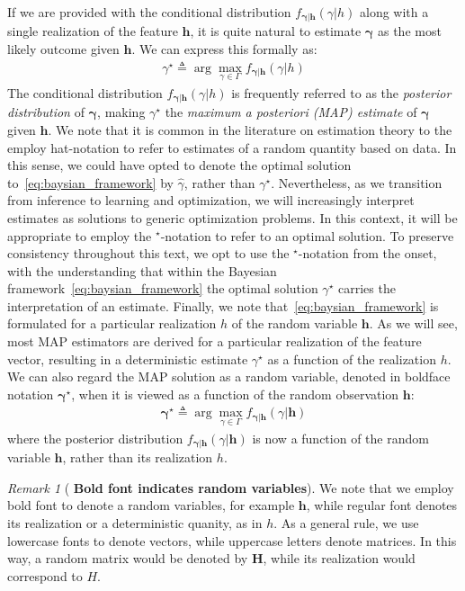\documentclass[oneside,11pt]{amsart}
\def\h{{\boldsymbol{h}}}
\theoremstyle{remark}
\newtheorem{remark}{Remark}[section]
\begin{document}
If we are provided with the conditional distribution \( f_{\boldsymbol{\gamma}|\boldsymbol{h}}(\gamma | h) \) along with a single realization of the feature \( \boldsymbol{h} \), it is quite natural to estimate \( \boldsymbol{\gamma} \) as the most likely outcome given \( \boldsymbol{h} \). We can express this formally as:
\begin{align}\label{eq:baysian_framework}
  {\gamma^{\star}} \triangleq \arg\max_{{\gamma} \in \Gamma} f_{\boldsymbol{\gamma}|\boldsymbol{h}}(\gamma | h)
\end{align}
The conditional distribution \( f_{\boldsymbol{\gamma}|\boldsymbol{h}}(\gamma | h) \) is frequently referred to as the \emph{posterior distribution} of \( \boldsymbol{\gamma} \), making \( {\gamma^{\star}} \) the \emph{maximum a posteriori (MAP) estimate} of \( \boldsymbol{\gamma} \) given \( \boldsymbol{h} \). We note that it is common in the literature on estimation theory to the employ hat-notation to refer to estimates of a random quantity based on data. In this sense, we could have opted to denote the optimal solution to~\eqref{eq:baysian_framework} by \( \widehat{\gamma} \), rather than \( \gamma^{\star} \). Nevertheless, as we transition from inference to learning and optimization, we will increasingly interpret estimates as solutions to generic optimization problems. In this context, it will be appropriate to employ the \( ^{\star} \)-notation to refer to an optimal solution. To preserve consistency throughout this text, we opt to use the \( ^{\star} \)-notation from the onset, with the understanding that within the Bayesian framework~\eqref{eq:baysian_framework} the optimal solution \( \gamma^{\star} \) carries the interpretation of an estimate. Finally, we note that~\eqref{eq:baysian_framework} is formulated for a particular realization \( h \) of the random variable \( \boldsymbol{h} \). As we will see, most MAP estimators are derived for a particular realization of the feature vector, resulting in a deterministic estimate \( \gamma^{\star} \) as a function of the realization \( h \). We can also regard the MAP solution as a random variable, denoted in boldface notation $\boldsymbol{\gamma}^{\star}$, when it is viewed as a function of the random observation \( \h\):
\begin{align}
  \boldsymbol{\gamma}^{\star} \triangleq \arg\max_{{\gamma} \in \Gamma} f_{\boldsymbol{\gamma}|\boldsymbol{h}}(\gamma | \boldsymbol{h})
\end{align}
where the posterior distribution \( f_{\boldsymbol{\gamma}|\boldsymbol{h}}(\gamma | \boldsymbol{h}) \) is now a function of the random variable \( \boldsymbol{h} \), rather than its realization \( h \).
{\begin{remark}[\textbf{ Bold font indicates random variables}] We note that we employ bold font to denote a random variables, for example \( \boldsymbol{h} \), while regular font denotes its realization or a deterministic quanity, as in \( h \). As a general rule, we use lowercase fonts to denote vectors, while uppercase letters denote matrices. In this way, a random matrix would be denoted by \( \boldsymbol{H} \), while its realization would correspond to \( H \).
\end{remark}
}
\end{document}
